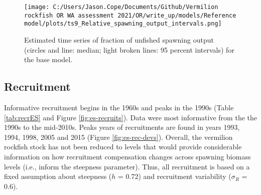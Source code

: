 \documentclass[11pt,
  english,
  a4paper,
]{article}
\begin{document}
\tagmcend\tagstructend


\begin{figure}
\centering
\texttt{[image: C:/Users/Jason.Cope/Documents/Github/Vermilion rockfish OR WA assessment 2021/OR/write\_up/models/Reference model/plots/ts9\_Relative\_spawning\_output\_intervals.png]}
\caption{Estimated time series of fraction of unfished spawning output (circles and line: median; light broken lines: 95 percent intervals) for the base model.\label{fig:es-depl}}
\end{figure}

\tagmcend\tagstructend

\clearpage


\hypertarget{recruitment}{%
\subsection*{Recruitment}\label{recruitment}}

\leavevmode\tagmcend\tagstructend


Informative recruitment begins in the 1960s and peaks in the 1990s (Table \ref{tab:recrES} and Figure \ref{fig:es-recruits}). Data were most informative from the the 1990s to the mid-2010s. Peaks years of recruitments are found in years 1993, 1994, 1998, 2005 and 2015 (Figure \ref{fig:es-rec-devs}). Overall, the vermilion rockfish stock has not been reduced to levels that would provide considerable information on how recruitment compensation changes across spawning biomass levels (i.e., inform the steepness parameter). Thus, all recruitment is based on a fixed assumption about steepness ({\(h\)\leavevmode\tagmcend\tagstructend} = 0.72) and recruitment variability ({\(\sigma_R\)\leavevmode\tagmcend\tagstructend} = 0.6).

\leavevmode\tagmcend\tagstructend\par


\end{document}
